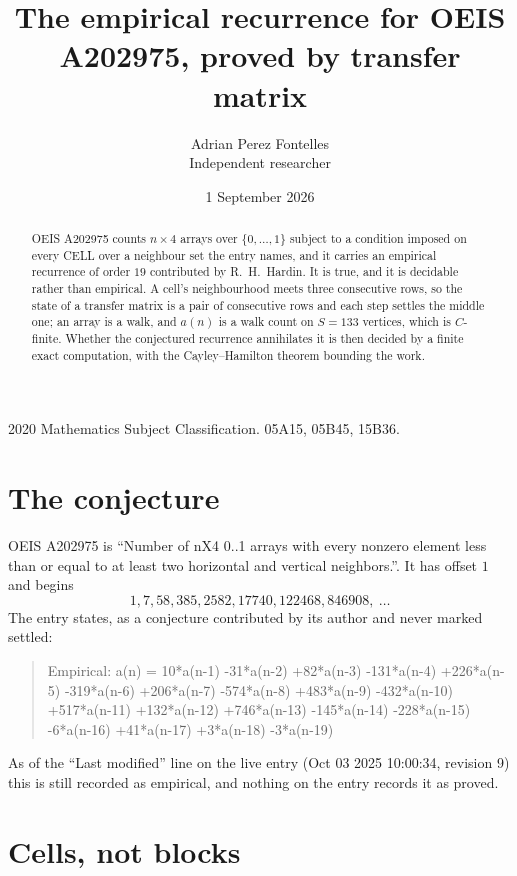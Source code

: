 \documentclass[11pt,a4paper]{article}
\title{The empirical recurrence for OEIS A202975, proved by transfer matrix}
\author{Adrian Perez Fontelles\\ \small Independent researcher}
\date{1 September 2026}
\theoremstyle{plain}
\theoremstyle{definition}
\begin{document}
\maketitle

\begin{abstract}
OEIS A202975 counts $n\times4$ arrays over $\{0,\dots,1\}$ subject to a condition imposed on
every CELL over a neighbour set the entry names, and it carries an empirical recurrence of
order $19$ contributed by R.~H.~Hardin. It is true, and it is decidable rather than
empirical. A cell's neighbourhood meets three consecutive rows, so the state of a transfer
matrix is a pair of consecutive rows and each step settles the middle one; an array is a
walk, and $a(n)$ is a walk count on $S=133$ vertices, which is $C$-finite. Whether the
conjectured recurrence annihilates it is then decided by a finite exact computation, with the
Cayley--Hamilton theorem bounding the work.
\end{abstract}

\noindent\small 2020 Mathematics Subject Classification. 05A15, 05B45, 15B36.\normalsize

\section{The conjecture}

OEIS A202975 is ``Number of nX4 0..1 arrays with every nonzero element less than or equal to at least two horizontal and vertical neighbors.''. It has offset $1$ and begins
\[
1, 7, 58, 385, 2582, 17740, 122468, 846908,\ \dots
\]
The entry states, as a conjecture contributed by its author and never marked settled:
\begin{quote}
Empirical: a(n) = 10*a(n-1) -31*a(n-2) +82*a(n-3) -131*a(n-4) +226*a(n-5) -319*a(n-6) +206*a(n-7) -574*a(n-8) +483*a(n-9) -432*a(n-10) +517*a(n-11) +132*a(n-12) +746*a(n-13) -145*a(n-14) -228*a(n-15) -6*a(n-16) +41*a(n-17) +3*a(n-18) -3*a(n-19)
\end{quote}
As of the ``Last modified'' line on the live entry (Oct 03 2025 10:00:34, revision 9) this is still
recorded as empirical, and nothing on the entry records it as proved.

\section{Cells, not blocks}
\end{document}
